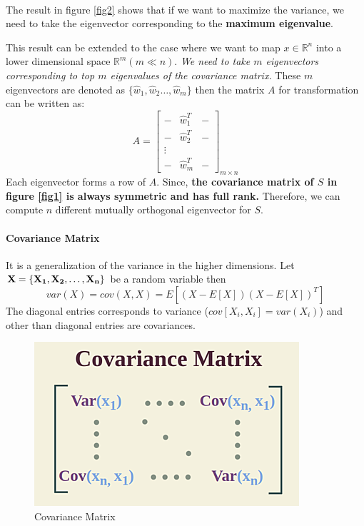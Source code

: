 \documentclass[12pt,reqno]{amsart}
\theoremstyle{plain}
\theoremstyle{definition}
\begin{document}
\\ \par The result in figure \ref{fig2} shows that if we want to maximize the variance, we need to take the eigenvector corresponding to the {\bf maximum eigenvalue}. \par This result can be extended to the case where we want to map $x \in \mathbb{R}^n$ into a lower dimensional space $\mathbb{R}^m (m \ll n)$. {\it We need to take $m$ eigenvectors corresponding to top $m$ eigenvalues of the covariance matrix.} These $m$ eigenvectors are denoted as $\{\hat{w}_1, \hat{w}_2 \dots, \hat{w}_m\}$ then the matrix $A$ for transformation can be written as:
$$ A = \begin{bmatrix}
    - & \hat{w}^T_1 &- \\
    - & \hat{w}^T_2 & - \\
    \vdots \\
    - & \hat{w}^T_m & - 
\end{bmatrix}_{m \times n}
$$
Each eigenvector forms a row of $A$. Since, {\bf the covariance matrix of $S$ in figure \ref{fig1} is always symmetric and has full rank.} Therefore, we can compute $n$ different mutually orthogonal eigenvector for $S$. 
\paragraph{\bf Covariance Matrix} It is a generalization of the variance in the higher dimensions. Let ${\bf X = \{X_1, X_2, \dots, X_n\}}$ be a random variable then
$$ var(X) = cov(X,X) = E[(X-E[X])(X-E[X])^T] $$
The diagonal entries corresponds to variance ($cov[X_i,X_i] = var(X_i)$) and other than diagonal entries are covariances.
\begin{figure}[!ht]
    \centerline{\includegraphics[scale=.5]{assests/covariance_matrix.png}}
    \caption{Covariance Matrix}
    \label{fig5}
\end{figure}
\end{document}
